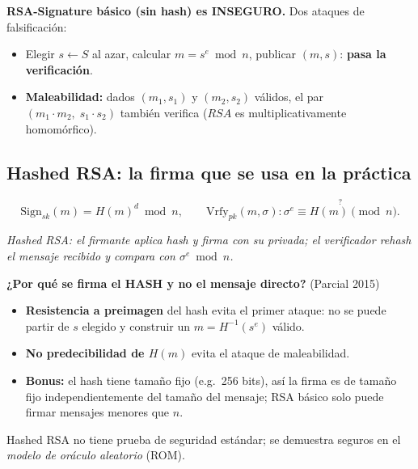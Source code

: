 \documentclass[11pt,a4paper]{article}
\newcommand{\diagcaption}[1]{\begin{center}\small\textit{#1}\end{center}}
\begin{document}
\begin{ojo}
\textbf{RSA-Signature básico (sin hash) es INSEGURO.} Dos ataques de falsificación:
\begin{itemize}[leftmargin=1.4em,nosep]
  \item Elegir $s \leftarrow S$ al azar, calcular $m = s^e \bmod n$, publicar
  $(m, s)$: \textbf{pasa la verificación}.
  \item \textbf{Maleabilidad:} dados $(m_1, s_1)$ y $(m_2, s_2)$ válidos,
  el par $(m_1 \cdot m_2,\; s_1 \cdot s_2)$ también verifica
  ($RSA$ es multiplicativamente homomórfico).
\end{itemize}
\end{ojo}

\subsection{Hashed RSA: la firma que se usa en la práctica}

\[
  \mathrm{Sign}_{sk}(m) = H(m)^d \bmod n, \qquad
  \mathrm{Vrfy}_{pk}(m, \sigma): \overset{?}{\sigma^e \equiv H(m) \pmod{n}}.
\]

\begin{center}
\end{center}
\diagcaption{Hashed RSA: el firmante aplica hash y firma con su privada; el
verificador rehash el mensaje recibido y compara con $\sigma^e \bmod n$.}

\begin{examen}
\textbf{¿Por qué se firma el HASH y no el mensaje directo?} (Parcial 2015)
\begin{itemize}[leftmargin=1.4em,nosep]
  \item \textbf{Resistencia a preimagen} del hash evita el primer ataque: no se puede
  partir de $s$ elegido y construir un $m = H^{-1}(s^e)$ válido.
  \item \textbf{No predecibilidad de $H(m)$} evita el ataque de maleabilidad.
  \item \textbf{Bonus:} el hash tiene tamaño fijo (e.g.\ 256 bits), así la firma es
  de tamaño fijo independientemente del tamaño del mensaje; RSA básico solo puede
  firmar mensajes menores que $n$.
\end{itemize}
Hashed RSA no tiene prueba de seguridad estándar; se demuestra seguros en el
\emph{modelo de oráculo aleatorio} (ROM).
\end{examen}
\end{document}
